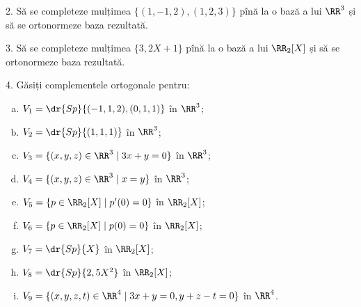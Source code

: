 2. Să se completeze mulțimea $ \{ (1, -1, 2), (1, 2, 3) \} $ pînă la o bază
a lui $ \RR^3 $ și să se ortonormeze baza rezultată.

\vspace{1cm}

3. Să se completeze mulțimea $ \{ 3, 2X + 1 \} $ pînă la o bază a lui $ \RR_2[X] $
și să se ortonormeze baza rezultată.

\vspace{1cm}

4. Găsiți complementele ortogonale pentru:
\begin{enumerate}[(a)]
\item $ V_1 = \dr{Sp} \{ (-1, 1, 2), (0, 1, 1) \} $ în $ \RR^3 $;
\item $ V_2 = \dr{Sp} \{ (1, 1, 1) \} $ în $ \RR^3 $;
\item $ V_3 = \{ (x, y, z) \in \RR^3 \mid 3x + y = 0 \} $ în $ \RR^3 $;
\item $ V_4 = \{ (x, y, z) \in \RR^3 \mid x = y \} $ în $ \RR^3 $;
\item $ V_5 = \{ p \in \RR_2[X] \mid p'(0) = 0 \} $ în $\RR_2[X] $;
\item $ V_6 = \{ p \in \RR_2[X] \mid p(0) = 0 \} $ în $ \RR_2[X] $;
\item $ V_7 = \dr{Sp}\{ X \} $ în $ \RR_2[X] $;
\item $ V_8 = \dr{Sp} \{ 2, 5X^2 \} $ în $ \RR_2[X] $;
\item $ V_9 = \{ (x, y, z, t) \in \RR^4 \mid 3x + y = 0, y + z - t = 0 \} $
  în $ \RR^4 $.
\end{enumerate}

